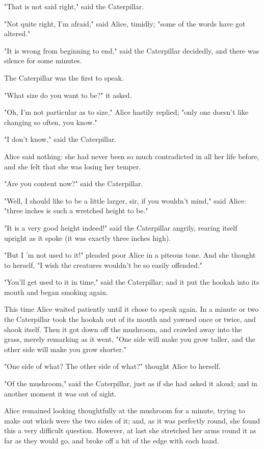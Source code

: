 ​"That is not said right," said the Caterpillar.

"Not quite right, I'm afraid," said Alice, timidly; "some of the words have got altered."

"It is wrong from beginning to end," said the Caterpillar decidedly, and there was silence for some minutes.

The Caterpillar was the first to speak.

"What size do you want to be?" it asked.

"Oh, I'm not particular as to size," Alice hastily replied; "only one doesn't like changing so often, you know."

"I don't know," said the Caterpillar.

Alice said nothing: she had never been so much contradicted in all her life before, and she felt that she was losing her temper.

"Are you content now?" said the Caterpillar.

"Well, I should like to be a little larger, sir, if you wouldn't mind," said Alice: "three inches is such a wretched height to be."

"It is a very good height indeed!" said the Caterpillar angrily, rearing itself upright as it spoke (it was exactly three inches high).

​"But I 'm not used to it!" pleaded poor Alice in a piteous tone. And she thought to herself, "I wish the creatures wouldn't be so easily offended."

"You'll get used to it in time," said the Caterpillar; and it put the hookah into its mouth and began smoking again.

This time Alice waited patiently until it chose to speak again. In a minute or two the Caterpillar took the hookah out of its mouth and yawned once or twice, and shook itself. Then it got down off the mushroom, and crawled away into the grass, merely remarking as it went, "One side will make you grow taller, and the other side will make you grow shorter."

"One side of what? The other side of what?" thought Alice to herself.

"Of the mushroom," said the Caterpillar, just as if she had asked it aloud; and in another moment it was out of sight.

Alice remained looking thoughtfully at the mushroom for a minute, trying to make out ​which were the two sides of it; and, as it was perfectly round, she found this a very difficult question. However, at last she stretched her arms round it as far as they would go, and broke off a bit of the edge with each hand.

